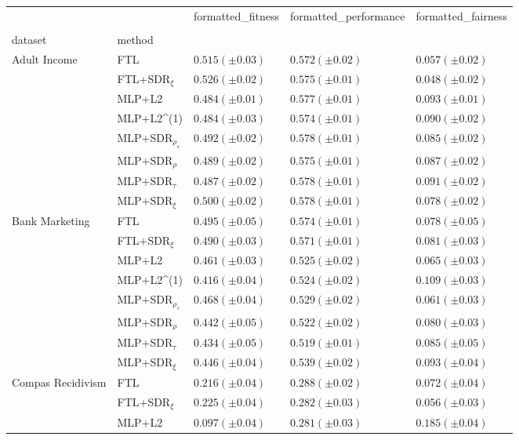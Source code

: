 \begin{tabular}{lllll}
\toprule
 &  & formatted_fitness & formatted_performance & formatted_fairness \\
 &  &  &  &  \\
dataset & method &  &  &  \\
\midrule
\multirow[t]{8}{*}{Adult Income} & FTL & $0.515 (\pm0.03)$ & $0.572 (\pm0.02)$ & $0.057 (\pm0.02)$ \\
 & FTL+SDR$_{\xi}$ & $0.526 (\pm0.02)$ & $0.575 (\pm0.01)$ & $0.048 (\pm0.02)$ \\
 & MLP+L2 & $0.484 (\pm0.01)$ & $0.577 (\pm0.01)$ & $0.093 (\pm0.01)$ \\
 & MLP+L2^{(1)} & $0.484 (\pm0.03)$ & $0.574 (\pm0.01)$ & $0.090 (\pm0.02)$ \\
 & MLP+SDR$_{\rho_s}$ & $0.492 (\pm0.02)$ & $0.578 (\pm0.01)$ & $0.085 (\pm0.02)$ \\
 & MLP+SDR$_{\rho}$ & $0.489 (\pm0.02)$ & $0.575 (\pm0.01)$ & $0.087 (\pm0.02)$ \\
 & MLP+SDR$_{\tau}$ & $0.487 (\pm0.02)$ & $0.578 (\pm0.01)$ & $0.091 (\pm0.02)$ \\
 & MLP+SDR$_{\xi}$ & $0.500 (\pm0.02)$ & $0.578 (\pm0.01)$ & $0.078 (\pm0.02)$ \\
\cline{1-5}
\multirow[t]{8}{*}{Bank Marketing} & FTL & $0.495 (\pm0.05)$ & $0.574 (\pm0.01)$ & $0.078 (\pm0.05)$ \\
 & FTL+SDR$_{\xi}$ & $0.490 (\pm0.03)$ & $0.571 (\pm0.01)$ & $0.081 (\pm0.03)$ \\
 & MLP+L2 & $0.461 (\pm0.03)$ & $0.525 (\pm0.02)$ & $0.065 (\pm0.03)$ \\
 & MLP+L2^{(1)} & $0.416 (\pm0.04)$ & $0.524 (\pm0.02)$ & $0.109 (\pm0.03)$ \\
 & MLP+SDR$_{\rho_s}$ & $0.468 (\pm0.04)$ & $0.529 (\pm0.02)$ & $0.061 (\pm0.03)$ \\
 & MLP+SDR$_{\rho}$ & $0.442 (\pm0.05)$ & $0.522 (\pm0.02)$ & $0.080 (\pm0.03)$ \\
 & MLP+SDR$_{\tau}$ & $0.434 (\pm0.05)$ & $0.519 (\pm0.01)$ & $0.085 (\pm0.05)$ \\
 & MLP+SDR$_{\xi}$ & $0.446 (\pm0.04)$ & $0.539 (\pm0.02)$ & $0.093 (\pm0.04)$ \\
\cline{1-5}
\multirow[t]{8}{*}{Compas Recidivism} & FTL & $0.216 (\pm0.04)$ & $0.288 (\pm0.02)$ & $0.072 (\pm0.04)$ \\
 & FTL+SDR$_{\xi}$ & $0.225 (\pm0.04)$ & $0.282 (\pm0.03)$ & $0.056 (\pm0.03)$ \\
 & MLP+L2 & $0.097 (\pm0.04)$ & $0.281 (\pm0.03)$ & $0.185 (\pm0.04)$ \\

\end{tabular}
